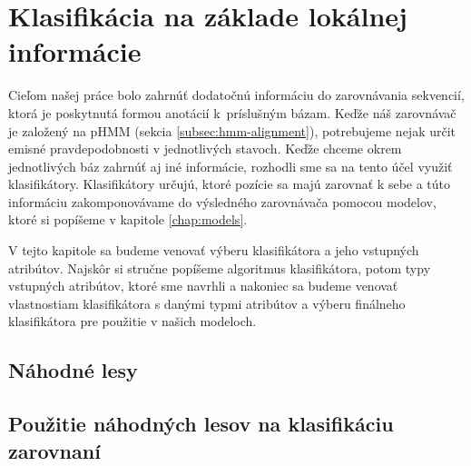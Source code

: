 \chapter[Klasifikácia]{Klasifikácia na základe lokálnej informácie}

Cieľom našej práce bolo zahrnúť dodatočnú informáciu do zarovnávania sekvencií, ktorá je poskytnutá formou anotácií k~príslušným bázam. Keďže náš zarovnávač je založený na pHMM (sekcia \ref{subsec:hmm-alignment}), potrebujeme nejak určit emisné pravdepodobnosti v jednotlivých stavoch. Keďže chceme okrem jednotlivých báz zahrnúť aj iné informácie, rozhodli sme sa na tento účel využiť klasifikátory. Klasifikátory určujú, ktoré pozície sa majú zarovnať k sebe a túto informáciu zakomponovávame do výsledného zarovnávača pomocou modelov, ktoré si popíšeme v kapitole \ref{chap:models}.

V tejto kapitole sa budeme venovať výberu klasifikátora a jeho vstupných atribútov. Najskôr si stručne popíšeme algoritmus klasifikátora, potom typy vstupných atribútov, ktoré sme navrhli a nakoniec sa budeme venovať vlastnostiam klasifikátora s danými typmi atribútov a výberu finálneho klasifikátora pre použitie v našich modeloch.

\section{Náhodné lesy}


\section[Použitie náh. lesov v zarovnaní]{Použitie náhodných lesov na klasifikáciu zarovnaní}
\label{sec:use-rf-alignment}

